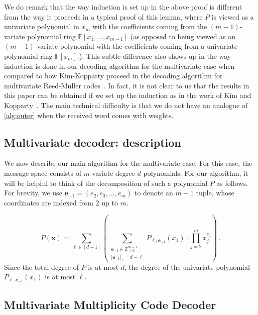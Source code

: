 \documentclass{article}
\def\Integer{\mathbb{Z}}
\def\Field{\mathbb{F}}
\let\Z\Integer
\let\F\Field
\def\vece{\mathbf{e}}
\def\vecx{\mathbf{x}}
\newcommand{\vx}{\vecx}
\newcommand{\ve}{\vece}
\begin{document}
	We do remark that the way induction is set up in the above proof is different from the way it proceeds in a typical proof of this lemma, where $P$ is viewed as a univariate polynomial in $x_m$ with the coefficients coming from the $(m-1)$-variate polynomial ring $\F[x_1, \ldots, x_{m-1}]$ (as opposed to being viewed as an $(m-1)$-variate polynomial with the coefficients coming from a univariate polynomial ring $\F[x_m]$.). This subtle difference also shows up in the way induction is done in our decoding algorithm for the multivariate case when compared to how Kim-Kopparty proceed in the decoding algorithm for multivariate Reed-Muller codes~\cite{KimK2017}. In fact, it is not clear to us that the results in this paper can be obtained if we set up the induction as in the work of Kim and Kopparty~\cite{KimK2017}. The main technical difficulty is that we do not have an analogue of \cref{alg:outer} when the received word comes with weights. 
	
	
	\subsection{Multivariate decoder: description}
	
	We now describe our main algorithm for the multivariate case. For this case, the message space consists of $m$-variate degree $d$ polynomials. For our algorithm, it will be helpful to think of the decomposition of such a polynomial $P$ as follows. For brevity, we use $\ve_{-1} = (e_2, e_3, \ldots, e_m)$ to denote an $m-1$ tuple, whose coordinates are indexed from $2$ up to $m$.
	
	\[
	P(\vx) = \sum_{\ell \in [d+1]} \left( \sum_{\substack{\ve_{-1} \in \Z_{\geq 0}^{m-1} \\ |\ve_{-1}|_{1} = d-\ell}} P_{\ell, \ve_{-1}}(x_1)\cdot \prod_{j = 2}^m x_j^{e_j} \right) \, .
	\]
	Since the total degree of $P$ is at most $d$, the degree of the univariate polynomial $P_{\ell, \ve_{-1}}(x_1)$ is at most $\ell$. 
	
	\subsection*{Multivariate Multiplicity Code Decoder}
	
\end{document}

